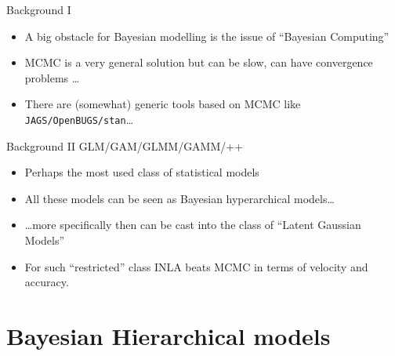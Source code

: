 \documentclass[
  ignorenonframetext,
]{beamer}
\providecommand{\tightlist}{%
  \setlength{\itemsep}{0pt}\setlength{\parskip}{0pt}}
\begin{document}
\begin{frame}[fragile]{Background I}
\protect\hypertarget{background-i}{}
\begin{itemize}[<+->]
\tightlist
\item
  A big obstacle for Bayesian modelling is the issue of ``Bayesian
  Computing''
\end{itemize}

\begin{itemize}[<+->]
\tightlist
\item
  MCMC is a very general solution but can be slow, can have convergence
  problems \ldots{}
\end{itemize}

\begin{itemize}[<+->]
\tightlist
\item
  There are (somewhat) generic tools based on MCMC like
  \texttt{JAGS/OpenBUGS/stan}\ldots{}
\end{itemize}
\end{frame}

\begin{frame}{Background II}
\protect\hypertarget{background-ii}{}
GLM/GAM/GLMM/GAMM/++

\begin{itemize}[<+->]
\tightlist
\item
  Perhaps the most used class of statistical models
\end{itemize}

\begin{itemize}[<+->]
\tightlist
\item
  All these models can be seen as Bayesian hyperarchical models\ldots{}
\end{itemize}

\begin{itemize}[<+->]
\tightlist
\item
  \ldots more specifically then can be cast into the class of ``Latent
  Gaussian Models''
\end{itemize}

\begin{itemize}[<+->]
\tightlist
\item
  For such ``restricted'' class INLA beats MCMC in terms of velocity and
  accuracy.
\end{itemize}
\end{frame}

\hypertarget{bayesian-hierarchical-models}{%
\section{Bayesian Hierarchical
models}\label{bayesian-hierarchical-models}}
\end{document}
